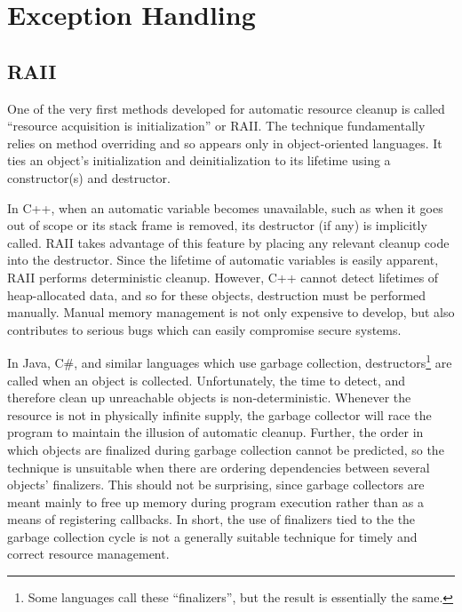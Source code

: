 \documentclass[11pt]{article}
\newcommand{\maybePage}{\newpage}
\begin{document}
\maybePage
\section{Exception Handling}

\subsection{RAII}
\label{RAII}

One of the very first methods developed for automatic resource cleanup is called ``resource acquisition is initialization'' or RAII.
The technique fundamentally relies on method overriding and so appears only in object-oriented languages.
It ties an object's initialization and deinitialization to its lifetime using a constructor(s) and destructor.

In C++, when an automatic variable becomes unavailable, such as when it goes out of scope or its stack frame is removed, its destructor (if any) is implicitly called.
RAII takes advantage of this feature by placing any relevant cleanup code into the destructor.\cite{cplusplusLanguage}
Since the lifetime of automatic variables is easily apparent, RAII performs deterministic cleanup.
However, C++ cannot detect lifetimes of heap-allocated data, and so for these objects, destruction must be performed manually.
Manual memory management is not only expensive to develop, but also contributes to serious bugs which can easily compromise secure systems.\cite{WeimerNecula08}


In Java, C\#, and similar languages which use garbage collection, destructors\footnote{Some languages call these ``finalizers'', but the result is essentially the same.} are called when an object is collected.
Unfortunately, the time to detect, and therefore clean up unreachable objects is non-deterministic.\cite{JavaStandard}\cite{cSharpStandard}
Whenever the resource is not in physically infinite supply, the garbage collector will race the program to maintain the illusion of automatic cleanup.\cite{WeimerNecula08}
Further, the order in which objects are finalized during garbage collection cannot be predicted, so the technique is unsuitable when there are ordering dependencies between several objects' finalizers.\cite{WeimerNecula08}
This should not be surprising, since garbage collectors are meant mainly to free up memory during program execution rather than as a means of registering callbacks.
In short, the use of finalizers tied to the the garbage collection cycle is not a generally suitable technique for timely and correct resource management.
\end{document}
